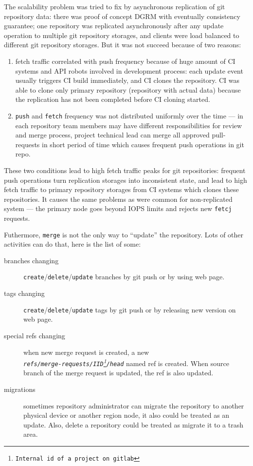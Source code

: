 \documentclass[nonacm=true]{acmart}
\newcommand{\code}[1]{\texttt{#1}}
\begin{document}
The scalability problem was tried to fix by asynchronous replication of git repository data:
there was proof of concept DGRM with eventually consistency guarantee;
one repository was replicated asynchronously after any update operation to multiple git repository storages,
and clients were load balanced to different git repository storages.
But it was not succeed because of two reasons:
\begin{enumerate}
  \item fetch traffic correlated with push frequency because of huge amount of
  CI systems and API robots involved in development process: each update event usually triggers
  CI build immediately, and CI clones the repository. CI was able to clone only
  primary repository (repository with actual data) because the replication has not been completed
  before CI cloning started.
  \item \code{push} and \code{fetch} frequency was not distributed uniformly over the time --- in each
  repository team members may have different responsibilities for review and merge process,
  project technical lead can merge all approved pull-requests in short period of time
  which causes frequent push operations in git repo.
\end{enumerate}

These two conditions lead to high fetch traffic peaks for git repositories:
frequent push operations turn replication storages into inconsistent state,
and lead to high fetch traffic to primary repository storages from CI systems which clones these repositories.
It causes the same problems as were common for non-replicated system --- the primary node goes beyond IOPS limits and
rejects new \code{fetcj} requests.

Futhermore, \code{merge} is not the only way to ``update'' the repository. Lots of other activities can do that,
here is the list of some:

\begin{description}
  \item[branches changing] \verb|create|/\verb|delete|/\verb|update| branches by git push or by using web page.
  \item[tags changing] \verb|create|/\verb|delete|/\verb|update| tags by git push or by releasing new version on web page.
  \item[special refs changing] when new merge request is created, a new\\
    \emph{\code{refs/merge-requests/IID\footnote{Internal id of a project on gitlab}/head}} named ref
    is created. When source branch of the merge request is updated, the ref is also updated.
  \item[migrations] sometimes repository administrator can migrate the repository to
    another physical device or another region node, it also could be treated as an update.
    Also, delete a repository could be treated as migrate it to a trash area.
\end{description}
\end{document}
